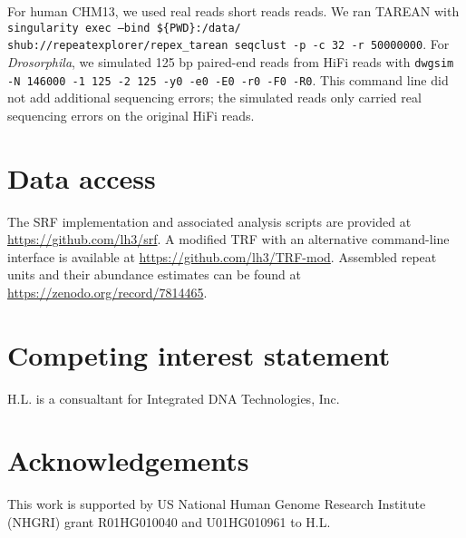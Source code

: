 \documentclass{bioinfo}
\begin{document}
For human CHM13, we used real reads short reads reads. We ran TAREAN with {\tt
singularity exec --bind \$\{PWD\}:/data/ shub://repeatexplorer/repex\_tarean
seqclust -p -c 32 -r 50000000}. For \emph{Drosorphila}, we simulated 125 bp
paired-end reads from HiFi reads with {\tt dwgsim -N 146000 -1 125 -2 125 -y0
-e0 -E0 -r0 -F0 -R0}. This command line did not add additional sequencing
errors; the simulated reads only carried real sequencing errors on the original
HiFi reads.

\section{Data access}

The SRF implementation and associated analysis scripts are provided at
\href{https://github.com/lh3/srf}{https://github.com/lh3/srf}. A modified TRF
with an alternative command-line interface is available at
\href{https://github.com/lh3/TRF-mod}{https://github.com/lh3/TRF-mod}.
Assembled repeat units and their abundance estimates can be found at
\href{https://zenodo.org/record/7814465}{https://zenodo.org/record/7814465}.

\section{Competing interest statement}

H.L. is a consualtant for Integrated DNA Technologies, Inc.

\section{Acknowledgements}

This work is supported by US National Human Genome Research Institute (NHGRI)
grant R01HG010040 and U01HG010961 to H.L.


\end{document}

